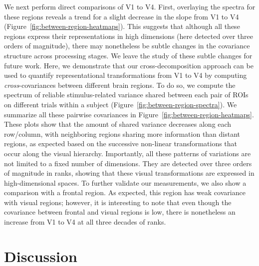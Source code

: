 \documentclass[10pt]{article}
\begin{document}
We next perform direct comparisons of V1 to V4. First, overlaying the spectra for these regions reveals a trend for a slight decrease in the slope from V1 to V4 (Figure~\ref{fig:between-region-heatmaps}). This suggests that although all these regions express their representations in high dimensions (here detected over three orders of magnitude), there may nonetheless be subtle changes in the covariance structure across processing stages. We leave the study of these subtle changes for future work. Here, we demonstrate that our cross-decomposition approach can be used to quantify representational transformations from V1 to V4 by computing \emph{cross}-covariances between different brain regions. To do so, we compute the spectrum of reliable stimulus-related variance shared between each pair of ROIs on different trials within a subject (Figure~\ref{fig:between-region-spectra}). We summarize all these pairwise covariances in Figure~\ref{fig:between-region-heatmaps}. These plots show that the amount of shared variance decreases along each row/column, with neighboring regions sharing more information than distant regions, as expected based on the successive non-linear transformations that occur along the visual hierarchy. Importantly, all these patterns of variations are not limited to a fixed number of dimensions. They are detected over three orders of magnitude in ranks, showing that these visual transformations are expressed in high-dimensional spaces. To further validate our measurements, we also show a comparison with a frontal region. As expected, this region has weak covariance with visual regions; however, it is interesting to note that even though the covariance between frontal and visual regions is low, there is nonetheless an increase from V1 to V4 at all three decades of ranks.

\section{Discussion}\label{discussion}
\end{document}
